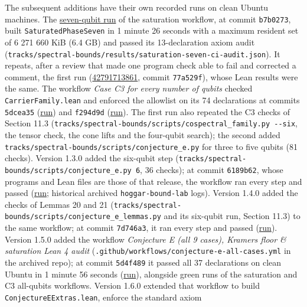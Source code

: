 \documentclass[11pt,a4paper]{article}
\begin{document}
The subsequent additions have their own recorded runs on clean Ubuntu machines. The
\href{https://github.com/0thernes/hoggar-bound-lab/actions/runs/42808984960}{seven-qubit run} of the
saturation workflow, at commit \texttt{b7b0273}, built \nolinkurl{SaturatedPhaseSeven} in 1 minute 26 seconds with a
maximum resident set of 6 271 660 KiB (6.4 GB) and passed its 13-declaration axiom audit
(\nolinkurl{tracks/spectral-bounds/results/saturation-seven-ci-audit.json}). It repeats, after a review that made one program check
able to fail and corrected a comment, the first run
(\href{https://github.com/0thernes/hoggar-bound-lab/actions/runs/42791713861}{42791713861}, commit
\texttt{77a529f}), whose Lean results were the same. The workflow \emph{Case C3 for every number of qubits} checked
\nolinkurl{CarrierFamily.lean} and enforced the allowlist on its 74 declarations at commits \texttt{5dcea35}
(\href{https://github.com/0thernes/hoggar-bound-lab/actions/runs/42797323071}{run}) and \texttt{f294d9d}
(\href{https://github.com/0thernes/hoggar-bound-lab/actions/runs/42801908151}{run}). The first run also
repeated the C3 checks of Section 11.3 (\texttt{tracks/spectral-bounds/scripts/cospectral\_family.py\ -\/-six}, the tensor check, the
cone lifts and the four-qubit search); the second added \nolinkurl{tracks/spectral-bounds/scripts/conjecture_e.py} for three to five
qubits (81 checks). Version 1.3.0 added the six-qubit step (\texttt{tracks/spectral-bounds/scripts/conjecture\_e.py\ 6}, 36 checks); at
commit \texttt{6189b62}, whose programs and Lean files are those of that release, the workflow ran every
step and passed (\href{https://github.com/0thernes/hoggar-bound-lab/actions/runs/42817286684}{run}; historical archived
\texttt{hoggar-bound-lab} logs). Version 1.4.0 added the checks of Lemmas 20 and 21
(\nolinkurl{tracks/spectral-bounds/scripts/conjecture_e_lemmas.py} and its six-qubit run, Section 11.3) to the same workflow; at commit
\texttt{7d746a3}, it ran every step and passed (\href{https://github.com/0thernes/hoggar-bound-lab/actions/runs/42834831157}{run}). Version 1.5.0 added the workflow \emph{Conjecture E (all 9 cases), Kramers
floor \& saturation Lean 4 audit} (\nolinkurl{.github/workflows/conjecture-e-all-cases.yml} in the archived repo); at commit \texttt{5d4f489}
it passed all 37 declarations on clean Ubuntu in 1 minute 56 seconds
(\href{https://github.com/0thernes/hoggar-bound-lab/actions/runs/44888403135}{run}), alongside green runs of
the saturation and C3 all-qubits workflows. Version 1.6.0 extended that workflow to build \nolinkurl{ConjectureEExtras.lean}, enforce the standard axiom
\end{document}
